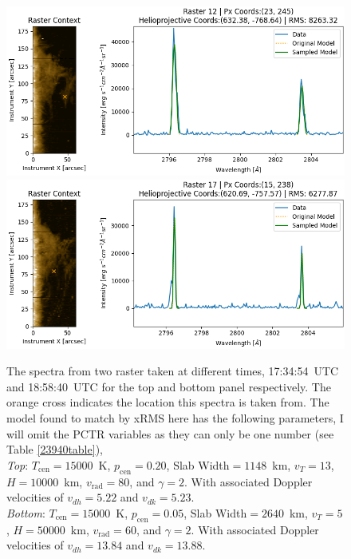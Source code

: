 \begin{figure}
    \includegraphics[width=\linewidth]{./02Modelling1D/figs/lineprofs/r12y23x245.png}
    \includegraphics[width=\linewidth]{./02Modelling1D/figs/lineprofs/r17y15x238.png}
    \caption[The \mgiihk{} spectra from two raster taken at different times, 17:34:54~UTC and 18:58:40~UTC]{The \mgiihk{} spectra from two raster taken at different times, 17:34:54~UTC and 18:58:40~UTC for the top and bottom panel respectively. The orange cross indicates the location this spectra is taken from. The model found to match by xRMS here has the following parameters, I will omit the PCTR variables as they can only be one number (see Table \ref{23940table}), \\\textit{Top}: $T_\text{cen}=15000$~K, $p_\text{cen}=0.20$\dyncm{}, Slab Width$=1148$~km, $v_T=13$\kms{}, $H=10000$~km, $v_{\text{rad}}=80$\kms{}, and $\gamma=2$. With associated Doppler velocities of $v_{dh}=5.22$\kms{} and $v_{dk}=5.23$\kms{}. \\\textit{Bottom}: $T_\text{cen}=15000$~K, $p_\text{cen}=0.05$\dyncm{}, Slab Width$=2640$~km, $v_T=5$\kms{}, $H=50000$~km, $v_{\text{rad}}=60$\kms{}, and $\gamma=2$. With associated Doppler velocities of $v_{dh}=13.84$\kms{} and $v_{dk}=13.88$\kms{}.}
    \label{similar}
\end{figure}

